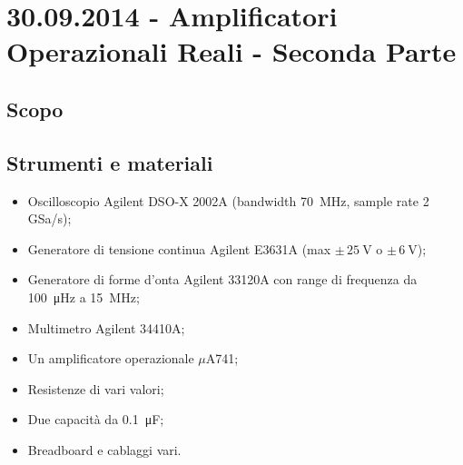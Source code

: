 \section{30.09.2014 - Amplificatori Operazionali Reali - Seconda Parte}

\subsection{Scopo}

\subsection{Strumenti e materiali}

\begin{itemize} [noitemsep]
\item Oscilloscopio Agilent DSO-X 2002A (bandwidth \SI{70}{\mega\hertz}, sample rate \num{2} GSa/s);
\item Generatore di tensione continua Agilent E3631A (max $\pm \, \SI{25}{\volt}$ o $\pm \, \SI{6}{\volt}$);
\item Generatore di forme d'onta Agilent 33120A con range di frequenza da \SI{100}{\micro\hertz} a \SI{15}{\mega\hertz};
\item Multimetro Agilent 34410A;
\item Un amplificatore operazionale $\mu$A741;
\item Resistenze di vari valori;
\item Due capacità da \SI{0.1}{\micro\farad};
\item Breadboard e cablaggi vari.
\end{itemize}
